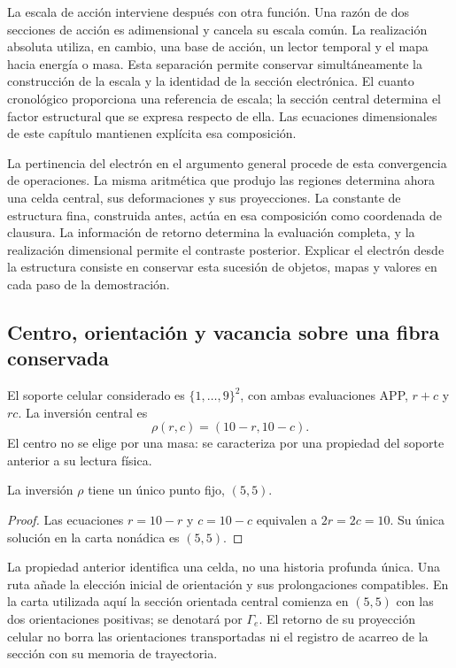 La escala de acción interviene después con otra función. Una razón de
dos secciones de acción es adimensional y cancela su escala común.
La realización absoluta utiliza, en cambio, una base de acción, un
lector temporal y el mapa hacia energía o masa. Esta separación permite
conservar simultáneamente la construcción de la escala y la identidad
de la sección electrónica. El cuanto cronológico proporciona una
referencia de escala; la sección central determina el factor estructural
que se expresa respecto de ella. Las ecuaciones dimensionales de este
capítulo mantienen explícita esa composición.

La pertinencia del electrón en el argumento general procede de esta
convergencia de operaciones. La misma aritmética que produjo las
regiones determina ahora una celda central, sus deformaciones y sus
proyecciones. La constante de estructura fina, construida antes, actúa
en esa composición como coordenada de clausura. La información de
retorno determina la evaluación completa, y la realización dimensional
permite el contraste posterior. Explicar el electrón desde la estructura
consiste en conservar esta sucesión de objetos, mapas y valores en cada
paso de la demostración.



\subsection{Centro, orientación y vacancia sobre una fibra conservada}

El soporte celular considerado es \(\{1,\ldots,9\}^2\), con ambas
evaluaciones APP, \(r+c\) y \(rc\). La inversión central es
\begin{equation}
 \rho(r,c)=(10-r,10-c).
 \label{x_reciprocidad:eq:el-inversion-central}
\end{equation}
El centro no se elige por una masa: se caracteriza por una propiedad del
soporte anterior a su lectura física.

\begin{proposition}
La inversión \(\rho\) tiene un único punto fijo, \((5,5)\).
\end{proposition}
\begin{proof}
Las ecuaciones \(r=10-r\) y \(c=10-c\) equivalen a
\(2r=2c=10\). Su única solución en la carta nonádica es \((5,5)\).
\end{proof}

La propiedad anterior identifica una celda, no una historia profunda
única. Una ruta añade la elección inicial de orientación y sus
prolongaciones compatibles. En la carta utilizada aquí la sección
orientada central comienza en \((5,5)\) con las dos orientaciones
positivas; se denotará por \(\Gamma_e\). El retorno de su proyección
celular no borra las orientaciones transportadas ni el registro de
acarreo de la sección con su memoria de trayectoria.

